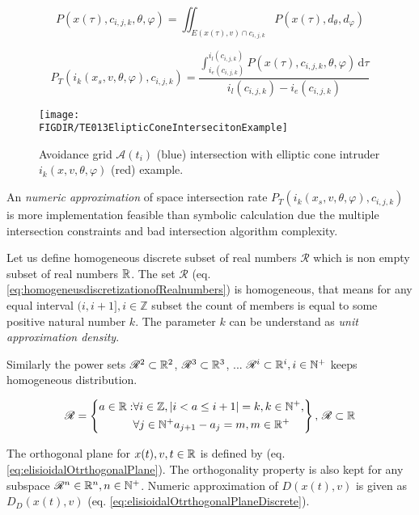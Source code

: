 \begin{equation}\label{eq:spreadIntersectionProbFixedtau}
    P({x}(\tau),c_{i,j,k},\theta,\varphi) =\iint_{E({x}(\tau),{v})\cap c_{i,j,k}} P({x}(\tau),d_\theta,d_\varphi)
\end{equation}

\begin{equation}\label{eq:spreadIntruderIntersectionProb}
    P_T(i_k({x}_s,{v},\theta,\varphi),c_{i,j,k})=\frac{\int_{i_e(c_{i,j,k})}^{i_l(c_{i,j,k})} P({x}(\tau),c_{i,j,k},\theta,\varphi)\,\text{d}\tau}{i_l(c_{i,j,k})-i_e(c_{i,j,k})}
\end{equation}

\begin{figure}[H]
    \centering
    \texttt{[image: \\FIGDIR/TE013ElipticConeIntersecitonExample]}
    \caption{Avoidance grid $\mathscr{A}(t_i)$ (blue) intersection with elliptic cone intruder $i_k({x},{v},\theta,\varphi)$ (red) example.}
    \label{fig:ellipticConeIntersectionExample}
\end{figure}

\noindent An \emph{numeric approximation} of space intersection rate $P_T(i_k({x}_s,{v},\theta,\varphi),c_{i,j,k})$ is more implementation feasible than symbolic calculation due the multiple intersection constraints and bad intersection algorithm complexity. 

Let us define homogeneous discrete subset of real numbers $\mathscr{R}$ which is non empty subset of real numbers $\mathbb{R}$. The set $\mathscr{R}$ (eq. \ref{eq:homogeneusdiscretizationofRealnumbers}) is homogeneous, that means for any equal interval $(i,i+1],i\in\mathbb{Z}$ subset the count of members is equal to some positive natural number $k$. The parameter $k$ can be understand as \emph{unit approximation density}.

Similarly the power sets $\mathscr{R}^2\subset\mathbb{R}^2$, $\mathscr{R}^3\subset\mathbb{R}^3$, ... $\mathscr{R}^i\subset\mathbb{R}^i,i\in\mathbb{N}^+$ keeps homogeneous distribution.

\begin{equation}\label{eq:homogeneusdiscretizationofRealnumbers}
    \mathscr{R} = \left\{\begin{aligned}a\in\mathbb{R}:&\forall i\in\mathbb{Z},|i<a\le i+1|=k,k\in\mathbb{N}^+, \\&\forall j\in \mathbb{N}^+a_{j+1}-a_{j}=m,m\in\mathbb{R}^+\end{aligned}\right\},\,\mathscr{R}\subset\mathbb{R}
\end{equation}

\noindent The orthogonal plane for ${x}(t), {v}, t \in\mathbb{R}$ is defined by (eq. \ref{eq:elisioidalOtrthogonalPlane}). The orthogonality property is also kept for any subspace $\mathscr{R}^n\in\mathbb{R}^n,n\in\mathbb{N}^+$. Numeric approximation of $D({x}(t),{v})$ is given as $D_D({x}(t),{v})$ (eq. \ref{eq:elisioidalOtrthogonalPlaneDiscrete}). 

